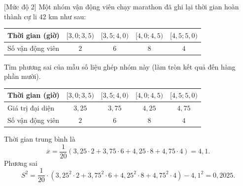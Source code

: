 \begin{bt}%
[Mức độ 2]%
Một nhóm vận động viên chạy marathon đã ghi lại thời gian hoàn thành cự li $42$ km như sau:
\begin{center}
\begin{tabular}{|l|c|c|c|c|}
\hline Thời gian (giờ) & {$[3{,}0; 3{,}5)$} & {$[3{,}5; 4{,}0)$} & {$[4{,}0; 4{,}5)$} & {$[4{,}5; 5{,}0)$} \\
\hline Số vận động viên & $2$ & $6$ & $8$ & $4$ \\
\hline
\end{tabular}
\end{center}
Tìm phương sai của mẫu số liệu ghép nhóm này (làm tròn kết quả đến hàng phần mười).
\loigiai
{
\begin{center}
\begin{tabular}{|l|c|c|c|c|}
\hline Thời gian (giờ) & {$[3{,}0; 3{,}5)$} & {$[3{,}5; 4{,}0)$} & {$[4{,}0; 4{,}5)$} & {$[4{,}5; 5{,}0)$} \\
\hline Giá trị đại diện & $3{,}25$ & $3{,}75$ & $4{,}25$ & $4{,}75$ \\
\hline Số vận động viên & $2$ & $6$ & $8$ & $4$ \\
\hline
\end{tabular}
\end{center}
Thời gian trung bình là
$$\overline{x}=\dfrac{1}{20}(3{,}25\cdot2+3{,}75\cdot6+4{,}25\cdot8+4{,}75\cdot4)=4{,}1.$$
Phương sai
$$S^2=\dfrac{1}{20}\cdot\left(3{,}25^2\cdot2+3{,}75^2\cdot6+4{,}25^2\cdot8+4{,}75^2\cdot4\right)-4{,}1^2=0{,}2025.$$
}
\end{bt}

